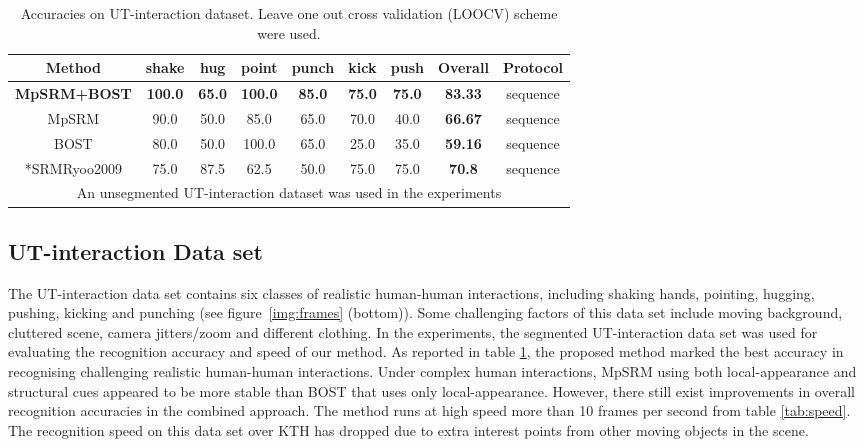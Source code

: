 \begin{table}
\centering
{\footnotesize
\begin{tabular}{|c|c|c|c|c|c|c|c|c|}
\hline
Method & shake & hug & point & punch & kick & push & \textbf{ Overall} & Protocol \\
\hline
\textbf{ \color{blue} MpSRM+BOST} & \textbf{ \color{blue} 100.0} & \textbf{ \color{blue}65.0} & \textbf{ \color{blue}100.0} & \textbf{ \color{blue}85.0} & \textbf{ \color{blue}75.0} & \textbf{ \color{blue}75.0} & \textbf{ \color{blue}83.33} & sequence\\
MpSRM & 90.0 & 50.0 & 85.0 & 65.0 & 70.0 & 40.0 & \textbf{ 66.67} & sequence\\
BOST & 80.0 & 50.0 & 100.0 & 65.0 & 25.0 & 35.0 & \textbf{ 59.16} & sequence\\
\hline
*SRM{Ryoo2009} & 75.0 & 87.5 & 62.5 & 50.0 & 75.0 & 75.0 & \textbf{ 70.8} & sequence\\
\hline
\multicolumn{9}{p{0.9\linewidth}}{\scriptsize * An unsegmented UT-interaction dataset was used in the experiments}\\
\end{tabular}
}
\caption{Accuracies on UT-interaction dataset. Leave one out cross validation (LOOCV) scheme were used.}
\label{tab:utcompare}
\end{table}
\subsection{UT-interaction Data set}
The UT-interaction data set contains six classes of realistic human-human interactions, including shaking hands, pointing, hugging, pushing, kicking and punching (see figure~\ref{img:frames} (bottom)). Some challenging factors of this data set include moving background, cluttered scene, camera jitters/zoom and different clothing. In the experiments, the segmented UT-interaction data set was used for evaluating the recognition accuracy and speed of our method. As reported in table \ref{tab:utcompare}, the proposed method marked the best accuracy in recognising challenging realistic human-human interactions. Under complex human interactions, MpSRM using both local-appearance and structural cues appeared to be more stable than BOST that uses only local-appearance. However, there still exist improvements in overall recognition accuracies in the combined approach. The method runs at high speed more than 10 frames per second from table \ref{tab:speed}. The recognition speed on this data set over KTH has dropped due to extra interest points from other moving objects in the scene.

